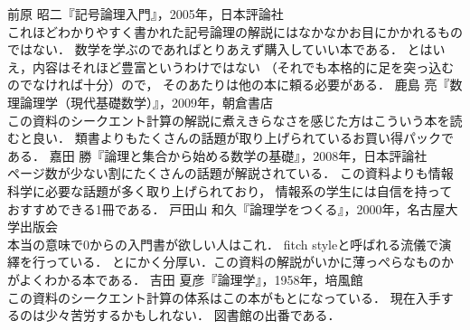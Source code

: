 \begin{thebibliography}{99}
  前原 昭二『記号論理入門』，2005年，日本評論社 \\
 これほどわかりやすく書かれた記号論理の解説にはなかなかお目にかかれるものではない．
 数学を学ぶのであればとりあえず購入していい本である．
 とはいえ，内容はそれほど豊富というわけではない
 （それでも本格的に足を突っ込むのでなければ十分）ので，
 そのあたりは他の本に頼る必要がある．
  鹿島 亮『数理論理学（現代基礎数学）』，2009年，朝倉書店 \\
 この資料のシークエント計算の解説に煮えきらなさを感じた方はこういう本を読むと良い．
 類書よりもたくさんの話題が取り上げられているお買い得パックである．
  嘉田 勝『論理と集合から始める数学の基礎』，2008年，日本評論社 \\
 ページ数が少ない割にたくさんの話題が解説されている．
 この資料よりも情報科学に必要な話題が多く取り上げられており，
 情報系の学生には自信を持っておすすめできる1冊である．
  戸田山 和久『論理学をつくる』，2000年，名古屋大学出版会 \\
 本当の意味で0からの入門書が欲しい人はこれ．
 fitch styleと呼ばれる流儀で演繹を行っている．
 とにかく分厚い．この資料の解説がいかに薄っぺらなものかがよくわかる本である．
  吉田 夏彦『論理学』，1958年，培風館 \\
 この資料のシークエント計算の体系はこの本がもとになっている．
 現在入手するのは少々苦労するかもしれない．
 図書館の出番である．

\begin{comment}
 \bibitem{utidaset} 内田 伏一『集合と位相（数学シリーズ）』，1986年，裳華房 \\
 集合論の入門書としては定番の1冊．この資料の次に読むならこのあたりを読むと良い．
 \bibitem{utidatopo} 内田 伏一『位相入門』，1997年，裳華房 \\
 同著者による本．{\cite{utidaset}}を大学の講義で使いやすいよう書き直したものらしい．
 位相空間論にさっさとたどり着きたいなら{\cite{utidaset}}よりも
 こちらを手に取るべきかもしれない．
 ただ1点残念なのは論理記号の使い方がよろしくないことである．
 \bibitem{matsuzaka} 松坂 和夫『集合・位相入門』，1968年，岩波書店 \\
 とてもていねいな記述がなされており読みやすい．
 おそらく高校生でも問題なく読める．
 とはいえ，かなり古い本であり，現代の数学ではあまりホットではない話題も
 多く含まれている点には注意すべきである．
 \bibitem{30kouset} 志賀 浩二『集合への30講（数学30講シリーズ）』，1988年，朝倉書店 \\
 有名な30講シリーズの中の1冊．わかりやすいと評判らしい．
 \bibitem{30koutopo} 志賀 浩二『位相への30講（数学30講シリーズ）』，1988年，朝倉書店 \\
 \cite{30kouset}の続刊とも言うべき本．基本的に集合論と位相空間論はセットである．
 \bibitem{kunen} Kenneth Kunen（藤田 博司 訳）『集合論-独立性証明への案内』，2008年，日本評論社 \\
 公理的集合論に関する本．研究分野として集合論を学ぼうとするような人間が読む本である．
 とはいえ，そんな人間なら邦訳ではなく原著を読むべきである．
 一般人は図書館あたりでちょこっとチラ見する程度でいいかも．
\end{comment}


\end{thebibliography}

